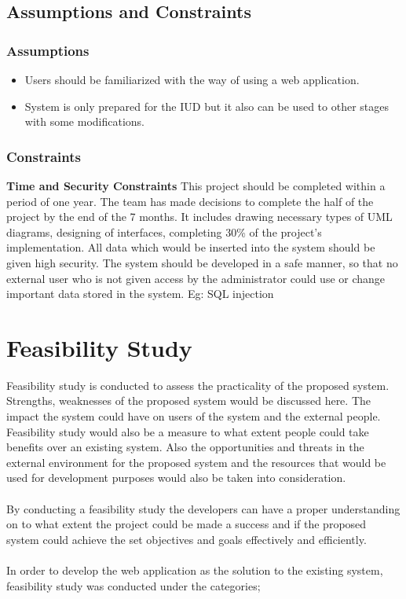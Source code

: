 \documentclass[a4paper,beamer]{article}
\begin{document}
	\subsection{Assumptions and Constraints}
	
	\subsubsection{Assumptions}
	\begin{itemize}
		\item Users should be familiarized with the way of using a web application.
		\item System is only prepared for the IUD but it also can be used to other stages with some modifications.
	\end{itemize}
	
	\subsubsection{Constraints}
	\textbf{Time and Security Constraints} \newline\newline
	This project should be completed within a period of one year. The team has made decisions to complete the half of the project by the end of the 7  months. It includes drawing necessary types of UML diagrams, designing of interfaces, completing 30\% of the project’s implementation.\newline\newline
	All data which would be inserted into the system should be given high security. The system should be developed in a safe manner, so that no external user who is not given access by the administrator could use or change important data stored in the system. Eg: SQL injection\newpage
	
	\section{Feasibility Study}
	Feasibility study is conducted to assess the practicality of the proposed system. Strengths, weaknesses of the proposed system would be discussed here. The impact the system could have on users of the system and the external people. Feasibility study would also be a measure to what extent people could take benefits over an existing system. Also the opportunities and threats in the external environment for the proposed system and the resources that would be used for development purposes would also be taken into consideration.\\\\
	By conducting a feasibility study the developers can have a proper understanding on to what extent the project could be made a success and if the proposed system could achieve the set objectives and goals effectively and efficiently.\\\\	
	In order to develop the web application as the solution to the existing system, feasibility study was conducted under the categories;
	
\end{document}
